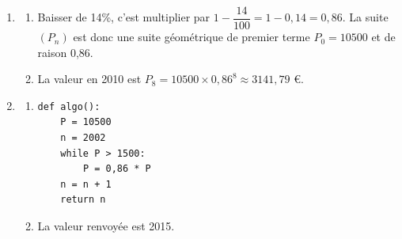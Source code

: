 \begin{enumerate}
\item 
\begin{enumerate}
	\item  	Baisser de 14\%, c'est multiplier par $1 - \dfrac{14}{100} = 1 - 0,14 = 0,86$. La suite $(P_n)$ est donc une suite géométrique de premier terme $P_0 = 10500$ et de raison 0,86.
		
		\item 	La valeur en 2010 est $P_8 = 10500 \times 0,86^8 \approx 3141,79$ €.
		\end{enumerate}
		\item 	\begin{enumerate}
				\item 			
\begin{lstlisting}[style=python]
def algo():
	P = 10500
	n = 2002
	while P > 1500:
		P = 0,86 * P
	n = n + 1
	return n
\end{lstlisting}
			\item	La valeur renvoyée est 2015.
		\end{enumerate}
	\end{enumerate}
